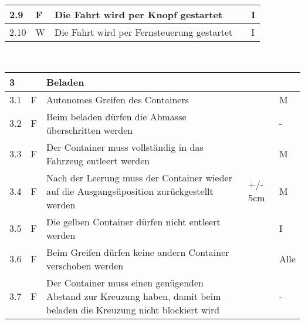 \begin{center}
\begin{tabular}{|p{1cm}|p{0.5cm}|p{5cm}|p{5cm}|p{1.5cm}|}
 2.9 & F & Die Fahrt wird per Knopf gestartet & & I\\\hline
 2.10 & W & Die Fahrt wird per Fernsteuerung gestartet & & I \\\hline
\end{tabular}\\[0.3cm]
\begin{tabular}{|p{1cm}|p{0.5cm}|p{5cm}|p{5cm}|p{1.5cm}|}\hline
 \textbf{3} & & \textbf{Beladen} & & \\\hline
 3.1 & F & Autonomes Greifen des Containers & & M\\\hline
 3.2 & F & Beim beladen dürfen die Abmasse überschritten werden & & -\\\hline
 3.3 & F & Der Container muss vollständig in das Fahrzeug entleert werden & & M\\\hline
 3.4 & F & Nach der Leerung muss der Container wieder auf die Ausgangsüposition zurückgestellt werden & +/- 5cm & M\\\hline
 3.5 & F & Die gelben Container dürfen nicht entleert werden & & I\\\hline
 3.6 & F & Beim Greifen dürfen keine andern Container verschoben werden & & Alle\\\hline
 3.7 & F & Der Container muss einen genügenden Abstand zur Kreuzung haben, damit beim beladen die Kreuzung nicht blockiert wird & & - \\\hline   
\end{tabular}
\end{center}
